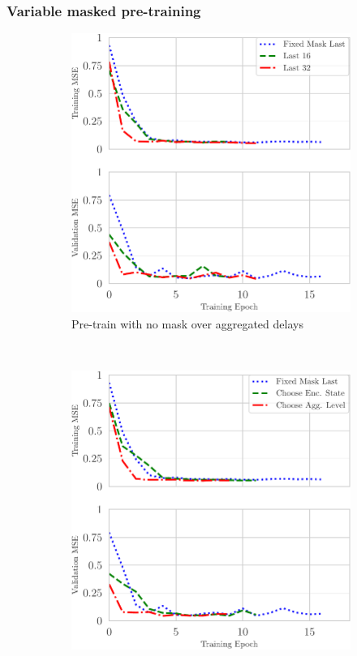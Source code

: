 \documentclass{beamer}
\begin{document}
\begin{frame}
\frametitle{Variable masked pre-training}


\begin{figure}[h]
    \centering
    \begin{subfigure}[h]{0.5\textwidth}
        \centering
        \includegraphics[scale=0.5]{figures/finetune_mct_loss_comparison.pdf}
        \caption{Pre-train with no mask over aggregated delays}
    \end{subfigure}%
    ~ 
    \begin{subfigure}[h]{0.5\textwidth}
        \centering
        \includegraphics[scale=0.5]{figures/finetune_mct_loss_comparison_agg.pdf}

\end{subfigure}
\end{figure}
\end{frame}
\end{document}
